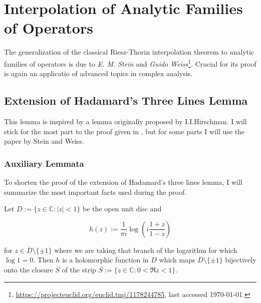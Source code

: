 \section{Interpolation of Analytic Families of Operators}
The generalization of the classical Riesz-Thorin interpolation theorem to analytic families of operators is due to \emph{E. M. Stein} and \emph{Guido  Weiss}\footnote{\href{https://projecteuclid.org/euclid.tmj/1178244785}{https://projecteuclid.org/euclid.tmj/1178244785}, last accessed \today.}. Crucial for its proof is again an applicatio of advanced topics in complex analysis.

\subsection{Extension of Hadamard's Three Lines Lemma}
This lemma is inspired by a lemma originally proposed by I.I.Hirschman. I will stick for the most part to the proof given in \cite[43--45]{grafakos:fourier:2014}, but for some parts I will use the paper by Stein and Weiss.


\subsubsection{Auxiliary Lemmata} To shorten the proof of the extension of Hadamard's three lines lemma, I will summarize the most important facts used during the proof.

\begin{lemma}
	Let $D := \{z \in \mathbb{C} : \vert z \vert < 1\}$ be the open unit disc and 
	
	\begin{equation*}
		h(z) := \frac{1}{\pi i}\log\left( i\frac{1 + z}{1 - z} \right)
	\end{equation*}

	for $z \in \overline{D} \setminus \{\pm 1\}$ where we are taking that branch of the logarithm for which $\log 1 = 0$. Then $h$ is a holomorphic function in $D$ which maps $\overline{D}\setminus \{\pm 1\}$ bijectively onto the closure $\overline{S}$ of the strip $S := \{z \in \mathbb{C} : 0 < \Re z < 1\}$.

	\label{lem:h}
\end{lemma}

